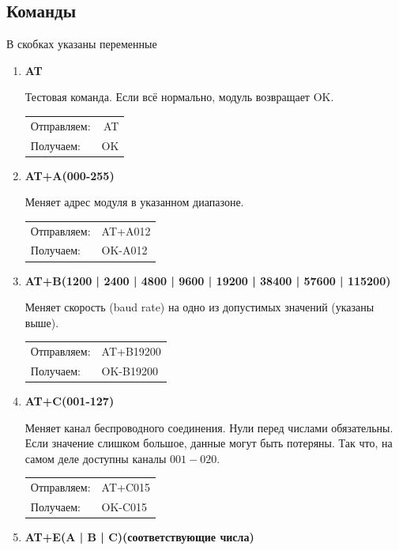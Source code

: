 \documentclass[bibliography=totocnumbered]{scrartcl}
\begin{document}
\subsection{Команды}


В скобках указаны переменные


\begin{enumerate}

\item \textbf{AT}

Тестовая команда. Если всё нормально, модуль возвращает OK.

\begin{tabular}{ l r }
  Отправляем: & AT \\
  Получаем: & OK \\
\end{tabular}


\item \textbf{ AT+A(000-255)}

Меняет адрес модуля в указанном диапазоне.

\begin{tabular}{ l l }
  Отправляем: & AT+A012 \\
  Получаем: & OK-A012 \\
\end{tabular}


\item \textbf{ AT+B(1200 | 2400 | 4800 | 9600 | 19200 | 38400 | 57600 | 115200)}

Меняет скорость (baud rate) на одно из допустимых значений (указаны выше).

\begin{tabular}{ l l }
  Отправляем: & AT+B19200 \\
  Получаем: & OK-B19200 \\
\end{tabular}


\item \textbf{ AT+C(001-127)}

Меняет канал беспроводного соединения. Нули перед числами обязательны. Если значение слишком большое, данные могут быть потеряны. Так что, на самом деле доступны каналы $001-020$.


\begin{tabular}{ l l }
  Отправляем: & AT+C015 \\
  Получаем: & OK-C015 \\
\end{tabular}


\item \textbf{AT+E(A | B | C)(соответствующие числа)}


\end{enumerate}
\end{document}
